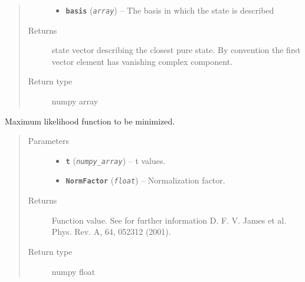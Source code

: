 \documentclass[letterpaper,10pt,english]{sphinxmanual}
\begin{document}
\begin{fulllineitems}
\begin{fulllineitems}
\begin{quote}
\begin{description}
\begin{itemize}
\item {} 
\textbf{\texttt{basis}} (\emph{\texttt{array}}) -- The basis in which the state is described

\end{itemize}

\item[{Returns}] \leavevmode
state vector describing the closest pure state. By convention the first vector element has vanishing complex component.

\item[{Return type}] \leavevmode
numpy array

\end{description}\end{quote}

\end{fulllineitems}


\begin{fulllineitems}
\label{modules:Tomography.DensityMatrix.fun}
Maximum likelihood function to be minimized.
\begin{quote}\begin{description}
\item[{Parameters}] \leavevmode\begin{itemize}
\item {} 
\textbf{\texttt{t}} (\emph{\texttt{numpy\_array}}) -- t values.

\item {} 
\textbf{\texttt{NormFactor}} (\emph{\texttt{float}}) -- Normalization factor.

\end{itemize}

\item[{Returns}] \leavevmode
Function value. See for further information D. F. V. James et al. Phys. Rev. A, 64, 052312 (2001).

\item[{Return type}] \leavevmode
numpy float

\end{description}\end{quote}

\end{fulllineitems}



\end{fulllineitems}
\end{document}
